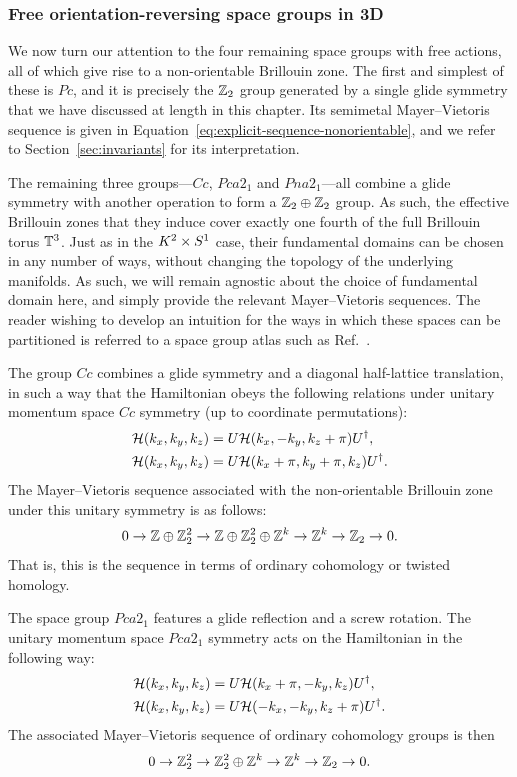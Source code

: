 \subsubsection{Free orientation-reversing space groups in 3D}

We now turn our attention to the four remaining space groups with free actions, all of which give rise to a non-orientable Brillouin zone. The first and simplest of these is $Pc$, and it is precisely the $\mathbb{Z}_2$ group generated by a single glide symmetry that we have discussed at length in this chapter. Its semimetal Mayer--Vietoris sequence is given in Equation~\eqref{eq:explicit-sequence-nonorientable}, and we refer to Section~\ref{sec:invariants} for its interpretation.

The remaining three groups---$Cc$, $Pca2_1$ and $Pna2_1$---all combine a glide symmetry with another operation to form a $\mathbb{Z}_2\oplus\mathbb{Z}_2$ group. As such, the effective Brillouin zones that they induce cover exactly one fourth of the full Brillouin torus $\mathbb{T}^3$. Just as in the $K^2\times S^1$ case, their fundamental domains can be chosen in any number of ways, without changing the topology of the underlying manifolds. As such, we will remain agnostic about the choice of fundamental domain here, and simply provide the relevant Mayer--Vietoris sequences. The reader wishing to develop an intuition for the ways in which these spaces can be partitioned is referred to a space group atlas such as Ref.~\cite{Cockcroft_CD-ROM}.

The group $Cc$ combines a glide symmetry and a diagonal half-lattice translation, in such a way that the Hamiltonian obeys the following relations under unitary momentum space $Cc$ symmetry (up to coordinate permutations):
\begin{align*}
	\mathcal{H}(k_x, k_y, k_z) &= U\mathcal{H}(k_x, -k_y, k_z+\pi)U^\dag, \\
	\mathcal{H}(k_x, k_y, k_z) &= U\mathcal{H}(k_x+\pi, k_y+\pi, k_z)U^\dag.
\end{align*}
The Mayer--Vietoris sequence associated with the non-orientable Brillouin zone under this unitary symmetry is as follows:
\begin{equation}
	0 \to \mathbb{Z}\oplus\mathbb{Z}_2^2 \to \mathbb{Z}\oplus\mathbb{Z}_2^2\oplus\mathbb{Z}^k \to \mathbb{Z}^k \to \mathbb{Z}_2 \to 0.
\end{equation}
That is, this is the sequence in terms of ordinary cohomology or twisted homology.

The space group $Pca2_1$ features a glide reflection and a screw rotation. The unitary momentum space $Pca2_1$ symmetry acts on the Hamiltonian in the following way:
\begin{align*}
	\mathcal{H}(k_x, k_y, k_z) &= U\mathcal{H}(k_x+\pi, -k_y, k_z)U^\dag, \\
	\mathcal{H}(k_x, k_y, k_z) &= U\mathcal{H}(-k_x, -k_y, k_z+\pi)U^\dag.
\end{align*}
The associated Mayer--Vietoris sequence of ordinary cohomology groups is then
\begin{equation}
	0 \to \mathbb{Z}_2^2 \to \mathbb{Z}_2^2\oplus\mathbb{Z}^k \to \mathbb{Z}^k \to \mathbb{Z}_2 \to 0.
\end{equation}

